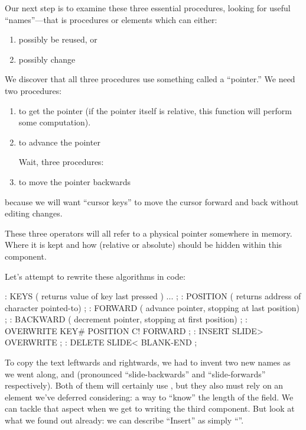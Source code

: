 Our next step is to examine these three essential procedures, looking
for useful ``names''---that is procedures or elements which can
either:

\begin{enumerate}
\item possibly be reused, or

\item possibly change
\end{enumerate}
We discover that all three procedures use something called a ``pointer.''
We need two procedures:

\begin{enumerate}
\item to get the pointer (if the pointer itself is relative, this
function will perform some computation).

\item to advance the pointer

Wait, three procedures:
\item to move the pointer backwards
\end{enumerate}
because we will want ``cursor keys'' to move the cursor forward and back
without editing changes.

These three operators will all refer to a physical pointer somewhere
in memory. Where it is kept and how (relative or absolute) should be
hidden within this component.

Let's attempt to rewrite these algorithms in code:

\begin{Code}
: KEYS ( returns value of key last pressed ) ... ;
: POSITION ( returns address of character pointed-to) ;
: FORWARD ( advance pointer, stopping at last position) ;
: BACKWARD ( decrement pointer, stopping at first position) ;
: OVERWRITE KEY# POSITION C! FORWARD ;
: INSERT SLIDE> OVERWRITE ;
: DELETE SLIDE< BLANK-END ;
\end{Code}
To copy the text leftwards and rightwards, we had to invent two new
names as we went along,  and  (pronounced
``slide-backwards'' and ``slide-forwards'' respectively). Both of them
will certainly use , but they also must rely on an element
we've deferred considering: a way to ``know'' the length of the
field. We can tackle that aspect when we get to writing the third
component.  But look at what we found out already: we can describe
``Insert'' as simply ``''.

